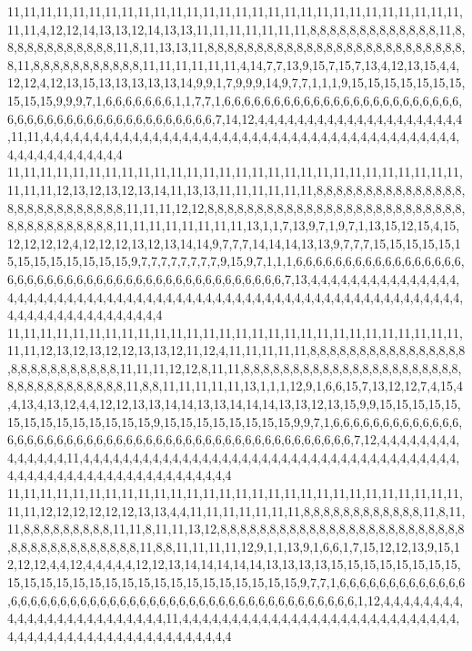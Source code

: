 11,11,11,11,11,11,11,11,11,11,11,11,11,11,11,11,11,11,11,11,11,11,11,11,11,11,11,11,11,11,4,12,12,14,13,13,12,14,13,13,11,11,11,11,11,11,11,8,8,8,8,8,8,8,8,8,8,8,8,8,11,8,8,8,8,8,8,8,8,8,8,8,8,11,8,11,13,13,11,8,8,8,8,8,8,8,8,8,8,8,8,8,8,8,8,8,8,8,8,8,8,8,8,8,8,8,11,8,8,8,8,8,8,8,8,8,8,8,11,11,11,11,11,11,4,14,7,7,13,9,15,7,15,7,13,4,12,13,15,4,4,12,12,4,12,13,15,13,13,13,13,13,14,9,9,1,7,9,9,9,14,9,7,7,1,1,1,9,15,15,15,15,15,15,15,15,15,15,9,9,9,7,1,6,6,6,6,6,6,6,1,1,7,7,1,6,6,6,6,6,6,6,6,6,6,6,6,6,6,6,6,6,6,6,6,6,6,6,6,6,6,6,6,6,6,6,6,6,6,6,6,6,6,6,6,6,6,6,6,6,7,14,12,4,4,4,4,4,4,4,4,4,4,4,4,4,4,4,4,4,4,4,4,4,11,11,4,4,4,4,4,4,4,4,4,4,4,4,4,4,4,4,4,4,4,4,4,4,4,4,4,4,4,4,4,4,4,4,4,4,4,4,4,4,4,4,4,4,4,4,4,4,4,4,4,4,4,4,4,4
11,11,11,11,11,11,11,11,11,11,11,11,11,11,11,11,11,11,11,11,11,11,11,11,11,11,11,11,11,11,11,12,13,12,13,12,13,14,11,13,13,11,11,11,11,11,11,8,8,8,8,8,8,8,8,8,8,8,8,8,8,8,8,8,8,8,8,8,8,8,8,8,8,8,11,11,11,12,12,8,8,8,8,8,8,8,8,8,8,8,8,8,8,8,8,8,8,8,8,8,8,8,8,8,8,8,8,8,8,8,8,8,8,8,8,8,11,11,11,11,11,11,11,11,13,1,1,7,13,9,7,1,9,7,1,13,15,12,15,4,15,12,12,12,12,4,12,12,12,13,12,13,14,14,9,7,7,7,14,14,14,13,13,9,7,7,7,15,15,15,15,15,15,15,15,15,15,15,15,15,9,7,7,7,7,7,7,7,7,9,15,9,7,1,1,1,6,6,6,6,6,6,6,6,6,6,6,6,6,6,6,6,6,6,6,6,6,6,6,6,6,6,6,6,6,6,6,6,6,6,6,6,6,6,6,6,6,6,6,6,6,7,13,4,4,4,4,4,4,4,4,4,4,4,4,4,4,4,4,4,4,4,4,4,4,4,4,4,4,4,4,4,4,4,4,4,4,4,4,4,4,4,4,4,4,4,4,4,4,4,4,4,4,4,4,4,4,4,4,4,4,4,4,4,4,4,4,4,4,4,4,4,4,4,4,4,4,4,4,4
11,11,11,11,11,11,11,11,11,11,11,11,11,11,11,11,11,11,11,11,11,11,11,11,11,11,11,11,11,11,12,13,12,13,12,12,13,13,12,11,12,4,11,11,11,11,11,8,8,8,8,8,8,8,8,8,8,8,8,8,8,8,8,8,8,8,8,8,8,8,8,8,8,8,11,11,11,12,12,8,11,11,8,8,8,8,8,8,8,8,8,8,8,8,8,8,8,8,8,8,8,8,8,8,8,8,8,8,8,8,8,8,8,8,8,8,11,8,8,11,11,11,11,11,13,1,1,1,12,9,1,6,6,15,7,13,12,12,7,4,15,4,4,13,4,13,12,4,4,12,12,13,13,14,14,13,13,14,14,14,13,13,12,13,15,9,9,15,15,15,15,15,15,15,15,15,15,15,15,15,15,9,15,15,15,15,15,15,15,15,9,9,7,1,6,6,6,6,6,6,6,6,6,6,6,6,6,6,6,6,6,6,6,6,6,6,6,6,6,6,6,6,6,6,6,6,6,6,6,6,6,6,6,6,6,6,6,6,6,6,6,6,7,12,4,4,4,4,4,4,4,4,4,4,4,4,4,4,11,4,4,4,4,4,4,4,4,4,4,4,4,4,4,4,4,4,4,4,4,4,4,4,4,4,4,4,4,4,4,4,4,4,4,4,4,4,4,4,4,4,4,4,4,4,4,4,4,4,4,4,4,4,4,4,4,4,4,4,4,4
11,11,11,11,11,11,11,11,11,11,11,11,11,11,11,11,11,11,11,11,11,11,11,11,11,11,11,11,11,11,12,12,12,12,12,12,13,13,4,4,11,11,11,11,11,11,11,8,8,8,8,8,8,8,8,8,8,8,8,11,8,11,11,8,8,8,8,8,8,8,8,8,11,11,8,11,11,13,12,8,8,8,8,8,8,8,8,8,8,8,8,8,8,8,8,8,8,8,8,8,8,8,8,8,8,8,8,8,8,8,8,8,8,8,8,8,8,11,8,8,11,11,11,11,12,9,1,1,13,9,1,6,6,1,7,15,12,12,13,9,15,12,12,12,4,4,12,4,4,4,4,4,12,12,13,14,14,14,14,14,13,13,13,13,15,15,15,15,15,15,15,15,15,15,15,15,15,15,15,15,15,15,15,15,15,15,15,15,15,15,9,7,7,1,6,6,6,6,6,6,6,6,6,6,6,6,6,6,6,6,6,6,6,6,6,6,6,6,6,6,6,6,6,6,6,6,6,6,6,6,6,6,6,6,6,6,6,6,6,6,6,6,1,12,4,4,4,4,4,4,4,4,4,4,4,4,4,4,4,4,4,4,4,4,4,4,4,4,11,4,4,4,4,4,4,4,4,4,4,4,4,4,4,4,4,4,4,4,4,4,4,4,4,4,4,4,4,4,4,4,4,4,4,4,4,4,4,4,4,4,4,4,4,4,4,4,4,4,4,4

